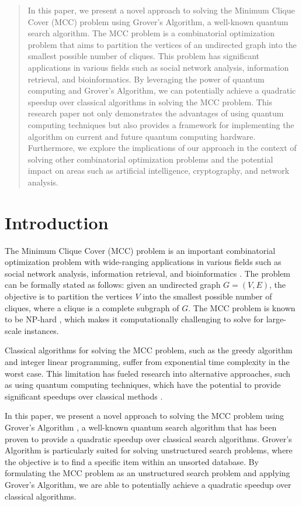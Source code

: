 \begin{abstract}
In this paper, we present a novel approach to solving the Minimum Clique Cover (MCC) problem using Grover's Algorithm, a well-known quantum search algorithm. The MCC problem is a combinatorial optimization problem that aims to partition the vertices of an undirected graph into the smallest possible number of cliques. This problem has significant applications in various fields such as social network analysis, information retrieval, and bioinformatics. By leveraging the power of quantum computing and Grover's Algorithm, we can potentially achieve a quadratic speedup over classical algorithms in solving the MCC problem. This research paper not only demonstrates the advantages of using quantum computing techniques but also provides a framework for implementing the algorithm on current and future quantum computing hardware. Furthermore, we explore the implications of our approach in the context of solving other combinatorial optimization problems and the potential impact on areas such as artificial intelligence, cryptography, and network analysis.
\end{abstract}

\section{Introduction}

The Minimum Clique Cover (MCC) problem is an important combinatorial optimization problem with wide-ranging applications in various fields such as social network analysis, information retrieval, and bioinformatics \cite{garey1979computers}. The problem can be formally stated as follows: given an undirected graph $G = (V, E)$, the objective is to partition the vertices $V$ into the smallest possible number of cliques, where a clique is a complete subgraph of $G$. The MCC problem is known to be NP-hard \cite{garey1979computers}, which makes it computationally challenging to solve for large-scale instances.

Classical algorithms for solving the MCC problem, such as the greedy algorithm and integer linear programming, suffer from exponential time complexity in the worst case. This limitation has fueled research into alternative approaches, such as using quantum computing techniques, which have the potential to provide significant speedups over classical methods \cite{nielsen2002quantum}.

In this paper, we present a novel approach to solving the MCC problem using Grover's Algorithm \cite{grover1996fast}, a well-known quantum search algorithm that has been proven to provide a quadratic speedup over classical search algorithms. Grover's Algorithm is particularly suited for solving unstructured search problems, where the objective is to find a specific item within an unsorted database. By formulating the MCC problem as an unstructured search problem and applying Grover's Algorithm, we are able to potentially achieve a quadratic speedup over classical algorithms.

